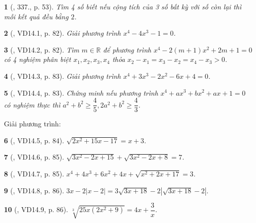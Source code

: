 \documentclass{article}
\newtheorem{baitoan}{}
\begin{document}
\begin{baitoan}[\cite{Binh_Toan_9_tap_2}, 337., p. 53]
	Tìm 4 số biết nếu cộng tích của 3 số bất kỳ với số còn lại thì mỗi kết quả đều bằng $2$.
\end{baitoan}

\begin{baitoan}[\cite{TLCT_THCS_Toan_9_dai_so}, VD14.1, p. 82]
	Giải phương trình $x^4 - 4x^3 - 1 = 0$.
\end{baitoan}

\begin{baitoan}[\cite{TLCT_THCS_Toan_9_dai_so}, VD14.2, p. 82]
	Tìm $m\in\mathbb{R}$ để phương trình $x^4 - 2(m + 1)x^2 + 2m + 1 = 0$ có 4 nghiệm phân biệt $x_1,x_2,x_3,x_4$ thỏa $x_2 - x_1 = x_3 - x_2 = x_4 - x_3 > 0$.
\end{baitoan}

\begin{baitoan}[\cite{TLCT_THCS_Toan_9_dai_so}, VD14.3, p. 83]
	Giải phương trình $x^4 + 3x^3 - 2x^2 - 6x + 4 = 0$.
\end{baitoan}

\begin{baitoan}[\cite{TLCT_THCS_Toan_9_dai_so}, VD14.4, p. 83]
	Chứng minh nếu phương trình $x^4 + ax^3 + bx^2 + ax + 1 = 0$ có nghiệm thực thì $a^2 + b^2\ge\dfrac{4}{5},2a^2 + b^2\ge\dfrac{4}{3}$.
\end{baitoan}
Giải phương trình:

\begin{baitoan}[\cite{TLCT_THCS_Toan_9_dai_so}, VD14.5, p. 84]
	$\sqrt{2x^2 + 15x - 17} = x + 3$.
\end{baitoan}

\begin{baitoan}[\cite{TLCT_THCS_Toan_9_dai_so}, VD14.6, p. 85]
	$\sqrt{3x^2 - 2x + 15} + \sqrt{3x^2 - 2x + 8} = 7$.
\end{baitoan}

\begin{baitoan}[\cite{TLCT_THCS_Toan_9_dai_so}, VD14.7, p. 85]
	$x^4 + 4x^3 + 6x^2 + 4x + \sqrt{x^2 + 2x + 17} = 3$.
\end{baitoan}

\begin{baitoan}[\cite{TLCT_THCS_Toan_9_dai_so}, VD14.8, p. 86]
	$3x - 2|x - 2| = 3\sqrt{3x + 18} - 2|\sqrt{3x + 18} - 2|.$
 \end{baitoan}

\begin{baitoan}[\cite{TLCT_THCS_Toan_9_dai_so}, VD14.9, p. 86]
	$\sqrt[3]{25x(2x^2 + 9)} = 4x + \dfrac{3}{x}$.
\end{baitoan}
\end{document}
